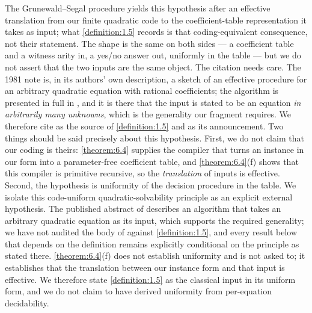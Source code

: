 The Grunewald–Segal procedure yields this hypothesis after an effective translation from our finite quadratic code to the coefficient-table representation it takes as input; what \cref{definition:1.5} records is that coding-equivalent consequence, not their statement. The shape is the same on both sides — a coefficient table and a witness arity in, a yes/no answer out, uniformly in the table — but we do not assert that the two inputs are the same object. The citation needs care. The 1981 note \cite{GS81} is, in its authors' own description, a sketch of an effective procedure for an arbitrary quadratic equation with rational coefficients; the algorithm is presented in full in \cite{GS04}, and it is there that the input is stated to be an equation \emph{in arbitrarily many unknowns}, which is the generality our fragment requires. We therefore cite \cite{GS04} as the source of \cref{definition:1.5} and \cite{GS81} as its announcement. Two things should be said precisely about this hypothesis. First, we do not claim that our coding is theirs: \cref{theorem:6.4} supplies the compiler that turns an instance in our form into a parameter-free coefficient table, and \cref{theorem:6.4}(f) shows that this compiler is primitive recursive, so the \emph{translation} of inputs is effective. Second, the hypothesis is uniformity of the decision procedure in the table. We isolate this code-uniform quadratic-solvability principle as an explicit external hypothesis. The published abstract of \cite{GS04} describes an algorithm that takes an arbitrary quadratic equation as its input, which supports the required generality; we have not audited the body of \cite{GS04} against \cref{definition:1.5}, and every result below that depends on the definition remains explicitly conditional on the principle as stated there. \cref{theorem:6.4}(f) does not establish uniformity and is not asked to; it establishes that the translation between our instance form and that input is effective. We therefore state \cref{definition:1.5} as the classical input in its uniform form, and we do not claim to have derived uniformity from per-equation decidability.

